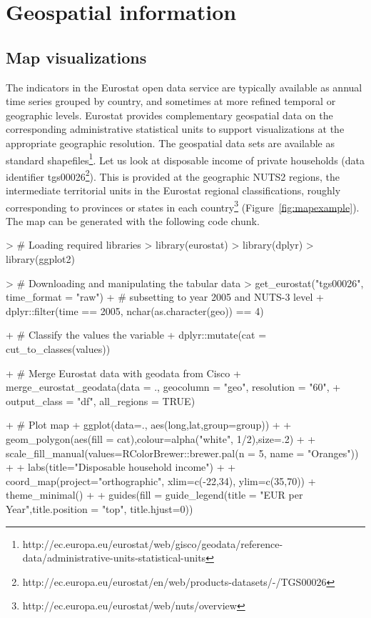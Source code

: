 \section{Geospatial information}

\subsection{Map visualizations}

The indicators in the Eurostat open data service are typically
available as annual time series grouped by country, and sometimes at
more refined temporal or geographic levels. Eurostat provides
complementary geospatial data on the corresponding administrative
statistical units to support visualizations at the appropriate
geographic resolution. The geospatial data sets are available as
standard
shapefiles\footnote{http://ec.europa.eu/eurostat/web/gisco/geodata/reference-data/administrative-units-statistical-units}. Let
us look at disposable income of private households (data identifier
tgs00026\footnote{http://ec.europa.eu/eurostat/en/web/products-datasets/-/TGS00026}). This
is provided at the geographic NUTS2 regions, the intermediate
territorial units in the Eurostat regional classifications, roughly
corresponding to provinces or states in each
country\footnote{http://ec.europa.eu/eurostat/web/nuts/overview} (Figure~\ref{fig:mapexample}). The map can be generated with the following code chunk.

\begin{example}
> # Loading required libraries
> library(eurostat)
> library(dplyr)
> library(ggplot2)

> # Downloading and manipulating the tabular data
> get_eurostat("tgs00026", time_format = "raw") %
+   # subsetting to year 2005 and NUTS-3 level
+   dplyr::filter(time == 2005, nchar(as.character(geo)) == 4) %

+   # Classify the values the variable
+   dplyr::mutate(cat = cut_to_classes(values)) %

+   # Merge Eurostat data with geodata from Cisco
+   merge_eurostat_geodata(data = ., geocolumn = "geo", resolution = "60",
+                          output_class = "df", all_regions = TRUE) %

+   # Plot map
+   ggplot(data=., aes(long,lat,group=group)) +
+   geom_polygon(aes(fill = cat),colour=alpha("white", 1/2),size=.2) +
+   scale_fill_manual(values=RColorBrewer::brewer.pal(n = 5, name = "Oranges")) +
+   labs(title="Disposable household income") +
+   coord_map(project="orthographic", xlim=c(-22,34), ylim=c(35,70)) + theme_minimal() +
+   guides(fill = guide_legend(title = "EUR per Year",title.position = "top", title.hjust=0))
\end{example}


